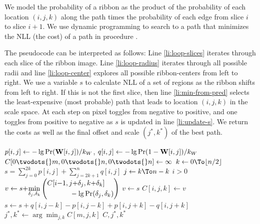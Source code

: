 We model the probability of a ribbon as the product of the probability of each location $(i, j, k)$ along the path times the probability of each edge from slice $i$ to slice $i+1$. We use dynamic programming to search to a path that minimizes the \ac{NLL} (the cost) of a path in procedure .

The pseudocode can be interpreted as follows: Line \ref{li:loop-slices} iterates through each slice of the ribbon image. Line \ref{li:loop-radius} iterates through all possible radii and line \ref{li:loop-center} explores all possible ribbon-centers from left to right. We use a variable $s$ to calculate \ac{NLL} of a set of regions as the ribbon shifts from left to right. If this is not the first slice, then line \ref{li:min-from-pred} selects the least-expensive (most probable) path that leads to location $(i, j, k)$ in the scale space.  At each step on pixel toggles from negative to positive, and one toggles from positive to negative as $s$ is updated in line \ref{li:update-s}.  We return the costs as well as the final offset and scale $(j^*, k^*)$ of the best path. 


\begin{codebox}
 \label{alg:segmet-ribbin}
\li $p[i,j]\gets -\lg \Pr(\mathbf{W}{}[i,j])/k_W{}$, 
          \hspace{2ex} $q[i,j] \gets -\lg \Pr(1-\mathbf{W}{}[i,j])/k_W{}$
\li $C{[0\twodots{}m, 0\twodots{}n, 0\twodots{}n]} \gets \infty$
\li {} \Do                                                \label{li:loop-slices}
\li     \For $k \gets 0 \To \lfloor n/2 \rfloor $ \Do                          \label{li:loop-radius}
\li         $s = \displaystyle{\sum_{j=0}^{2k} p[i,j] +\sum_{j=2k+1}^n  q[i, j] }$
\li         \For $j \gets k \To n-k$ \Do  \label{li:loop-center}
\li              \If $i > 0$  \Do                                              \label{li:if-has-pred}
\li              $v \gets s {+}\displaystyle{\min_{\delta_j, \delta_k}\left(  
                              \begin{aligned}
                              C[i{-}1,j{+}\delta_j,k{+}\delta_k] \hspace{3ex}\\
                              \hfill{}-\lg \Pr(\delta_j, \delta_k)
                              \end{aligned}
                            \right)}$  
                               \label{li:min-from-pred}
\li              \Else $v\gets s$
                 \End
\li              $C{[i, j, k]} \gets v$                                       \label{li:dp-store}
\li              $s \gets s{+}q[i,j{-}k]{-}p[i, j{-}k]{+}p[i, j{+}k]{-}q[i,j{+}k]$ \label{li:update-s}
           \End
       \End
    \End
\li $j^*, k^* \gets \displaystyle{\arg\min_{j,k} C{[m, j, k]}}$
\li \Return $C, j^*, k^*$
\end{codebox}

